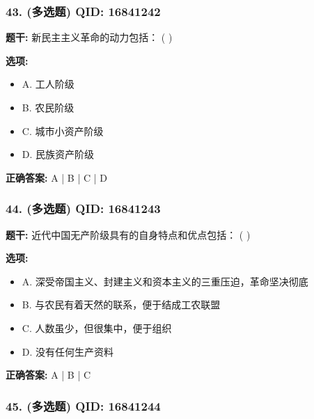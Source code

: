 \documentclass[12pt,UTF8]{ctexart}
\begin{document}
\subsubsection*{43. (多选题) \small QID: 16841242}

\textbf{题干:}
新民主主义革命的动力包括： ( )

\textbf{选项:}
\begin{itemize}[leftmargin=*]

  \item A. 工人阶级

  \item B. 农民阶级

  \item C. 城市小资产阶级

  \item D. 民族资产阶级

\end{itemize}

\textbf{正确答案:}
A | B | C | D

\vspace{0.3em}\hrulefill\vspace{0.7em}

\subsubsection*{44. (多选题) \small QID: 16841243}

\textbf{题干:}
近代中国无产阶级具有的自身特点和优点包括： ( )

\textbf{选项:}
\begin{itemize}[leftmargin=*]

  \item A. 深受帝国主义、封建主义和资本主义的三重压迫，革命坚决彻底

  \item B. 与农民有着天然的联系，便于结成工农联盟

  \item C. 人数虽少，但很集中，便于组织

  \item D. 没有任何生产资料

\end{itemize}

\textbf{正确答案:}
A | B | C

\vspace{0.3em}\hrulefill\vspace{0.7em}

\subsubsection*{45. (多选题) \small QID: 16841244}
\end{document}
